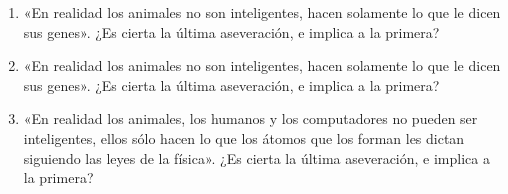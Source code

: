 \documentclass[spanish,11pt,twoside]{article}
\begin{document}
\begin{enumerate}
\item «En realidad los animales no son inteligentes, hacen solamente lo que le dicen sus genes». ¿Es cierta la última aseveración, e implica a la primera?

\item «En realidad los animales no son inteligentes, hacen solamente lo que le dicen sus genes». ¿Es cierta la última aseveración, e implica a la primera?

\item «En realidad los animales, los humanos y los computadores no pueden ser inteligentes, ellos sólo hacen lo que los átomos que los forman les dictan siguiendo las leyes de la física». ¿Es cierta la última aseveración, e implica a la primera?


\end{enumerate}

\renewcommand{\refname}{Bibliografía} %


\nocite{russell2004inteligencia} %
\nocite{*} %

\end{document}
